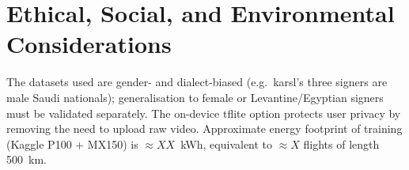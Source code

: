\section{Ethical, Social, and Environmental Considerations}
\label{sec:disc:ethics}

The datasets used are gender- and dialect-biased (e.g.\ \gls{karsl}'s
three signers are male Saudi nationals); generalisation to female or
Levantine/Egyptian signers must be validated separately. The on-device
\gls{tflite} option protects user privacy by removing the need to upload
raw video. Approximate energy footprint of training (Kaggle P100 + MX150)
is $\approx XX$~kWh, equivalent to $\approx X$ flights of length
\SI{500}{\kilo\metre}.
